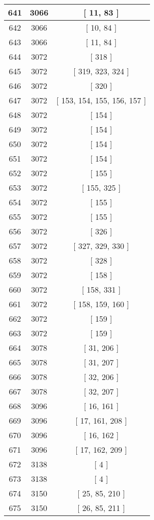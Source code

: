 \begin{center}
\begin{longtable}[H]{|| c c c ||}
\hline
641 & 3066 & [ 11, 83 ] \\ 
\hline
642 & 3066 & [ 10, 84 ] \\ 
\hline
643 & 3066 & [ 11, 84 ] \\ 
\hline
644 & 3072 & [ 318 ] \\ 
\hline
645 & 3072 & [ 319, 323, 324 ] \\ 
\hline
646 & 3072 & [ 320 ] \\ 
\hline
647 & 3072 & [ 153, 154, 155, 156, 157 ] \\ 
\hline
648 & 3072 & [ 154 ] \\ 
\hline
649 & 3072 & [ 154 ] \\ 
\hline
650 & 3072 & [ 154 ] \\ 
\hline
651 & 3072 & [ 154 ] \\ 
\hline
652 & 3072 & [ 155 ] \\ 
\hline
653 & 3072 & [ 155, 325 ] \\ 
\hline
654 & 3072 & [ 155 ] \\ 
\hline
655 & 3072 & [ 155 ] \\ 
\hline
656 & 3072 & [ 326 ] \\ 
\hline
657 & 3072 & [ 327, 329, 330 ] \\ 
\hline
658 & 3072 & [ 328 ] \\ 
\hline
659 & 3072 & [ 158 ] \\ 
\hline
660 & 3072 & [ 158, 331 ] \\ 
\hline
661 & 3072 & [ 158, 159, 160 ] \\ 
\hline
662 & 3072 & [ 159 ] \\ 
\hline
663 & 3072 & [ 159 ] \\ 
\hline
664 & 3078 & [ 31, 206 ] \\ 
\hline
665 & 3078 & [ 31, 207 ] \\ 
\hline
666 & 3078 & [ 32, 206 ] \\ 
\hline
667 & 3078 & [ 32, 207 ] \\ 
\hline
668 & 3096 & [ 16, 161 ] \\ 
\hline
669 & 3096 & [ 17, 161, 208 ] \\ 
\hline
670 & 3096 & [ 16, 162 ] \\ 
\hline
671 & 3096 & [ 17, 162, 209 ] \\ 
\hline
672 & 3138 & [ 4 ] \\ 
\hline
673 & 3138 & [ 4 ] \\ 
\hline
674 & 3150 & [ 25, 85, 210 ] \\ 
\hline
675 & 3150 & [ 26, 85, 211 ] \\ 

\end{longtable}
\end{center}
